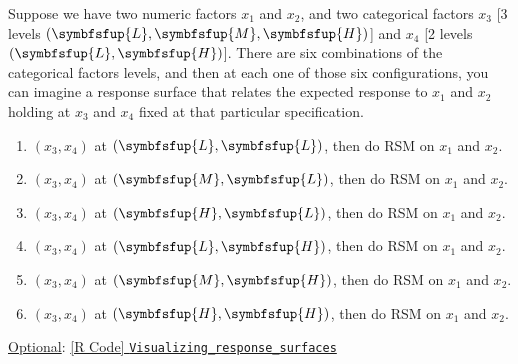 \begin{itemize}
        \begin{Example}{}
            Suppose we have two numeric factors $ x_1 $ and $ x_2 $, and two categorical factors $ x_3 $ [3 levels $(\symbfsfup{L}, \symbfsfup{M}, \symbfsfup{H})$] and
            $ x_4 $ [2 levels $(\symbfsfup{L}, \symbfsfup{H})$]. There are six combinations of the categorical factors levels, and then at each one of those six configurations,
            you can imagine a response surface that relates the expected response to $ x_1 $ and $ x_2 $ holding at $ x_3 $ and $ x_4 $ fixed at that particular specification.
            \begin{enumerate}[1.]
                \item $ (x_3,x_4) $ at $(\symbfsfup{L},\symbfsfup{L})$, then do RSM on $ x_1 $ and $ x_2 $.
                \item $ (x_3,x_4) $ at $(\symbfsfup{M},\symbfsfup{L})$, then do RSM on $ x_1 $ and $ x_2 $.
                \item $ (x_3,x_4) $ at $(\symbfsfup{H},\symbfsfup{L})$, then do RSM on $ x_1 $ and $ x_2 $.
                \item $ (x_3,x_4) $ at $(\symbfsfup{L},\symbfsfup{H})$, then do RSM on $ x_1 $ and $ x_2 $.
                \item $ (x_3,x_4) $ at $(\symbfsfup{M},\symbfsfup{H})$, then do RSM on $ x_1 $ and $ x_2 $.
                \item $ (x_3,x_4) $ at $(\symbfsfup{H},\symbfsfup{H})$, then do RSM on $ x_1 $ and $ x_2 $.
            \end{enumerate}
        \end{Example}
\end{itemize}
\underline{Optional}: \href{https://github.com/Hextical/university-notes/blob/master/year-3/semester-3/STAT 430/code/W12/Visualizing_response_surfaces.R}{[R Code] \texttt{Visualizing\_response\_surfaces}}
